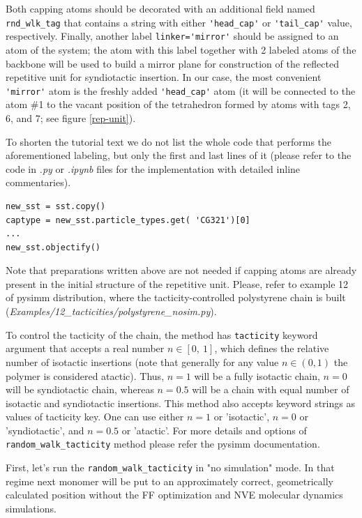 \documentclass[9pt,tutorial]{livecoms}
\begin{document}
Both capping atoms should be decorated with an additional field named \lstinline$rnd_wlk_tag$ that contains a string with either \lstinline$'head_cap'$ or \lstinline$'tail_cap'$ value, respectively. Finally, another label \lstinline$linker='mirror'$ should be assigned to an atom of the system; the atom with this label together with 2 labeled atoms of the backbone will be used to build a mirror plane for construction of the reflected repetitive unit for syndiotactic insertion. In our case, the most convenient \lstinline$'mirror'$ atom is the freshly added \lstinline$'head_cap'$ atom (it will be connected to the atom \#1 to the vacant position of the tetrahedron formed by atoms with tags 2, 6, and 7; see figure \ref{rep-unit}).

To shorten the tutorial text we do not list the whole code that performs the aforementioned labeling, but only the first and last lines of it (please refer to the code in \textit{.py} or \textit{.ipynb} files for the implementation with detailed inline commentaries).

\begin{lstlisting}
new_sst = sst.copy()
captype = new_sst.particle_types.get( 'CG321')[0]
...
new_sst.objectify()
\end{lstlisting}

Note that preparations written above are not needed if capping atoms are already present in the initial structure of the repetitive unit. Please, refer to example 12 of pysimm distribution, where the tacticity-controlled polystyrene chain is built  (\textit{Examples/12\_tacticities/polystyrene\_nosim.py}).

To control the tacticity of the chain, the method has \lstinline$tacticity$ keyword argument that accepts a real number $n \in [0,\ 1]$, which defines the relative number of isotactic insertions (note that generally for any value $n \in (0, 1)$ the polymer is considered atactic). Thus, $n = 1$ will be a fully isotactic chain, $n = 0$ will be syndiotactic chain, whereas $n = 0.5$ will be a chain with equal number of isotactic and syndiotactic insertions. This method also accepts keyword strings as values of tacticity key. One can use either $n = 1$ or 'isotactic', $n = 0$ or 'syndiotactic', and $n = 0.5$ or 'atactic'. For more details and options of \lstinline$random_walk_tacticity$ method please refer the pysimm documentation.

First, let's run the \lstinline$random_walk_tacticity$ in "no simulation" mode. In that regime next monomer will be put to an approximately correct, geometrically calculated position without the FF optimization and NVE molecular dynamics simulations.
\end{document}

